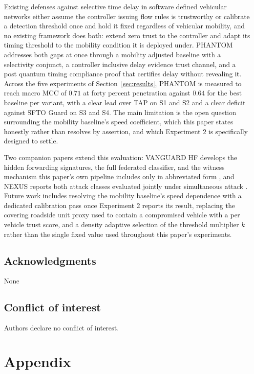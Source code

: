 \documentclass[final,5p,twocolumn]{elsarticle}
\theoremstyle{remark}
\theoremstyle{plain}
\begin{document}
Existing defenses against selective time delay in software defined
vehicular networks either assume the controller issuing flow rules is
trustworthy or calibrate a detection threshold once and hold it fixed
regardless of vehicular mobility, and no existing framework does both:
extend zero trust to the controller and adapt its timing threshold to the
mobility condition it is deployed under. PHANTOM addresses both gaps at
once through a mobility adjusted baseline with a selectivity conjunct, a
controller inclusive delay evidence trust channel, and a post quantum
timing compliance proof that certifies delay without revealing it. Across
the five experiments of Section~\ref{sec:results}, PHANTOM is
measured to reach macro MCC of $0.71$ at forty percent penetration against $0.64$ for the best
baseline per variant, with a clear lead over TAP on S1 and S2 and a clear deficit against SFTO Guard
on S3 and S4. The main limitation is the open question surrounding the
mobility baseline's speed coefficient, which this paper states honestly
rather than resolves by assertion, and which Experiment 2 is specifically
designed to settle.

Two companion papers extend this evaluation: VANGUARD HF develops the
hidden forwarding signatures, the full federated classifier, and the
witness mechanism this paper's own pipeline includes only in abbreviated
form \cite{VanguardHF2026}, and NEXUS reports both attack classes evaluated
jointly under simultaneous attack \cite{Nexus2026}. Future work includes
resolving the mobility baseline's speed dependence with a dedicated
calibration pass once Experiment 2 reports its result, replacing the
covering roadside unit proxy used to contain a compromised vehicle with a
per vehicle trust score, and a density adaptive selection of the threshold
multiplier $k$ rather than the single fixed value used throughout this
paper's experiments.

\subsection{Acknowledgments}
\noindent None

\subsection{Conflict of interest}
\noindent Authors declare no conflict of interest.

\section[\appendixname~\thesection]{Appendix}
\label{appendix}
\end{document}
